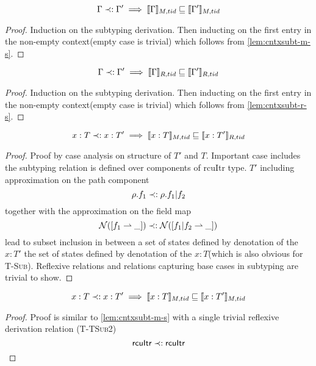 \begin{lemma}\label{lem:cntxsubt-m}
\[ \Gamma \prec: \Gamma'  \implies \llbracket \Gamma \rrbracket_{M,tid} \sqsubseteq \llbracket  \Gamma' \rrbracket_{M,tid} \]
\end{lemma}
\begin{proof}
  
Induction on the subtyping derivation. Then inducting on the first entry in the non-empty context(empty case is trivial) which follows from \ref{lem:cntxsubt-m-s}.
\end{proof}
\begin{lemma}\label{lem:cntxsubt-r}
\[ \Gamma \prec: \Gamma'  \implies \llbracket \Gamma \rrbracket_{R,tid} \sqsubseteq \llbracket  \Gamma' \rrbracket_{R,tid} \]
\end{lemma}
\begin{proof}
Induction on the subtyping derivation. Then inducting on the first entry in the non-empty context(empty case is trivial) which follows from \ref{lem:cntxsubt-r-s}.
\end{proof}
\begin{lemma}\label{lem:cntxsubt-m-s}
  \[ x:T \prec: x:T'  \implies \llbracket x:T \rrbracket_{M,tid} \sqsubseteq \llbracket  x:T' \rrbracket_{R,tid} \]
\end{lemma}
\begin{proof}
  Proof by case analysis on structure of $T'$ and $T$. Important case includes the subtyping relation is defined over components of \textsf{rcuItr} type. $T'$ including approximation on the path component
  \[\rho.f_1 \prec: \rho.f_1|f_2\]
  together with the approximation on the field map
  \[\mathcal{N}([f_1 \rightharpoonup \_ ]) \prec: \mathcal{N}([f_1|f_2 \rightharpoonup \_ ])\]
  lead to subset inclusion in between a set of states defined by denotation of the $x:T'$ the set of states defined by denotation of the $x:T$(which is also obvious for \textsc{T-Sub}). Reflexive relations and relations capturing base cases in subtyping are trivial to show.
  \end{proof}
\begin{lemma}\label{lem:cntxsubt-r-s}
  \[ x:T \prec: x:T'  \implies \llbracket x:T \rrbracket_{M,tid} \sqsubseteq \llbracket  x:T' \rrbracket_{M,tid} \]
\end{lemma}
\begin{proof}
  Proof is similar to \ref{lem:cntxsubt-m-s} with a single trivial reflexive derivation relation (\textsc{T-TSub2})
\[\textsf{rcuItr} \prec: \textsf{rcuItr}\]
  \end{proof}
